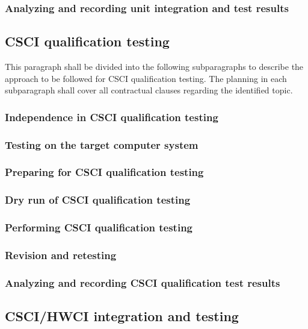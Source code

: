 \documentclass{fidata-report-template}
\begin{document}
\subsubsection{Analyzing and recording unit integration and test
results}

\subsection{CSCI qualification testing}

This paragraph shall be divided into the following subparagraphs to
describe the approach to be followed for CSCI qualification testing. The
planning in each subparagraph shall cover all contractual clauses
regarding the identified topic.

\subsubsection{Independence in CSCI qualification testing}

\subsubsection{Testing on the target computer system}

\subsubsection{Preparing for CSCI qualification testing}

\subsubsection{Dry run of CSCI qualification testing}

\subsubsection{Performing CSCI qualification testing}

\subsubsection{Revision and retesting}

\subsubsection{Analyzing and recording CSCI qualification test results}

\subsection{CSCI/HWCI integration and testing}
\end{document}
